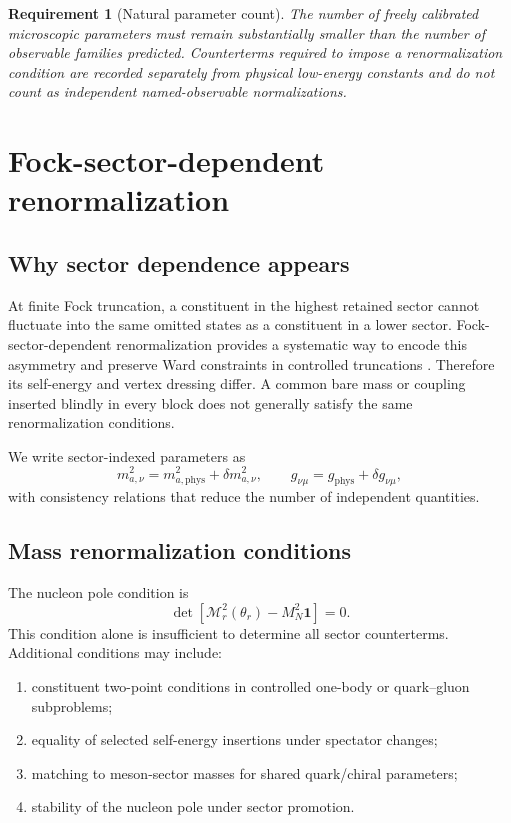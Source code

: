 \documentclass[11pt]{article}
\newtheorem{requirement}[definition]{Requirement}
\newcommand{\cM}{\mathcal M}
\newcommand{\bbone}{\bm 1}
\newcommand{\phys}{\mathrm{phys}}
\begin{document}
\begin{requirement}[Natural parameter count]
The number of freely calibrated microscopic parameters must remain
substantially smaller than the number of observable families predicted.
Counterterms required to impose a renormalization condition are recorded
separately from physical low-energy constants and do not count as independent
named-observable normalizations.
\label{req:natural-parameter-count}
\end{requirement}

\section{Fock-sector-dependent renormalization}
\label{sec:fsdr}

\subsection{Why sector dependence appears}

At finite Fock truncation, a constituent in the highest retained sector cannot
fluctuate into the same omitted states as a constituent in a lower sector.
Fock-sector-dependent renormalization provides a systematic way to encode this
asymmetry and preserve Ward constraints in controlled truncations
\cite{Karmanov2005,Karmanov2008,Karmanov2012}.
Therefore its self-energy and vertex dressing differ.  A common bare mass or
coupling inserted blindly in every block does not generally satisfy the same
renormalization conditions.

We write sector-indexed parameters as
\begin{equation}
 m_{a,\nu}^{2}
 =m_{a,\phys}^{2}+\delta m_{a,\nu}^{2},
 \qquad
 g_{\nu\mu}
 =g_{\phys}+\delta g_{\nu\mu},
 \label{eq:fsdr-parameters}
\end{equation}
with consistency relations that reduce the number of independent quantities.

\subsection{Mass renormalization conditions}

The nucleon pole condition is
\begin{equation}
 \det\left[
 \cM_r^{2}(\theta_r)-M_N^2\bbone
 \right]=0.
 \label{eq:nucleon-pole}
\end{equation}
This condition alone is insufficient to determine all sector counterterms.
Additional conditions may include:
\begin{enumerate}
 \item constituent two-point conditions in controlled one-body or
 quark--gluon subproblems;
 \item equality of selected self-energy insertions under spectator changes;
 \item matching to meson-sector masses for shared quark/chiral parameters;
 \item stability of the nucleon pole under sector promotion.
\end{enumerate}
\end{document}
